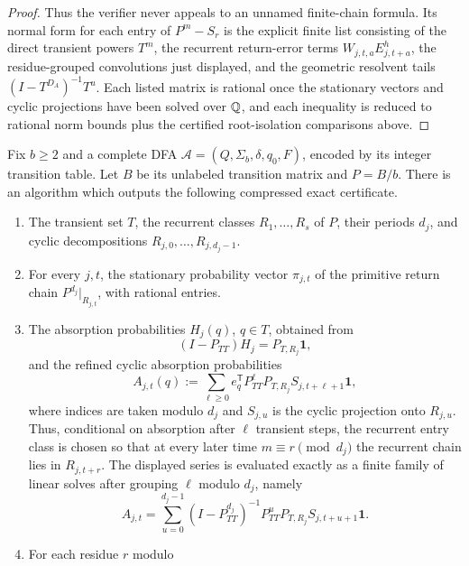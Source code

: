 \begin{proof}
  Thus the verifier never appeals to an unnamed finite-chain formula.
  Its normal form for each entry of \(P^m-S_r\) is the explicit finite
  list consisting of the direct transient powers \(T^m\), the recurrent
  return-error terms \(W_{j,t,a}E_{j,t+a}^h\), the residue-grouped
  convolutions just displayed, and the geometric resolvent tails
  \((I-T^{D_A})^{-1}T^u\). Each listed matrix is rational once the
  stationary vectors and cyclic projections have been solved over
  \(\mathbb{Q}\), and each inequality is reduced to rational norm bounds plus
  the certified root-isolation comparisons above.
\end{proof}

\begin{theorem}
  \label{thm:effective-fixed-dfa-prime-obstruction}
  Fix \(b\ge2\) and a complete DFA
  \(\mathcal A=(Q,\Sigma_b,\delta,q_0,F)\), encoded by its integer
  transition table. Let \(B\) be its unlabeled transition matrix and
  \(P=B/b\). There is an algorithm which outputs the following
  compressed exact certificate.
  \begin{enumerate}[label=\textup{(\alph*)}]
    \item The transient set \(T\), the recurrent classes
    \(R_1,\dots,R_s\) of \(P\), their periods \(d_j\), and cyclic
    decompositions \(R_{j,0},\dots,R_{j,d_j-1}\).
    \item For every \(j,t\), the stationary probability vector
    \(\pi_{j,t}\) of the primitive return chain
    \(P^{d_j}|_{R_{j,t}}\), with rational entries.
    \item The absorption probabilities \(H_j(q)\), \(q\in T\), obtained
    from
    \[
      (I-P_{TT})H_j=P_{T,R_j}\mathbf 1,
    \]
    and the refined cyclic absorption probabilities
    \[
      A_{j,t}(q)
      :=\sum_{\ell\ge0}
        e_q^{\mathsf T}P_{TT}^{\ell}P_{T,R_j}
        S_{j,t+\ell+1}\mathbf 1 ,
    \]
    where indices are taken modulo \(d_j\) and
    \(S_{j,u}\) is the cyclic projection onto \(R_{j,u}\).
    Thus, conditional on absorption after \(\ell\) transient steps, the
    recurrent entry class is chosen so that at every later time
    \(m\equiv r\pmod {d_j}\) the recurrent chain lies in
    \(R_{j,t+r}\). The displayed series is evaluated exactly as a
    finite family of linear solves after grouping \(\ell\) modulo
    \(d_j\), namely
    \[
      A_{j,t}
      =
      \sum_{u=0}^{d_j-1}
      (I-P_{TT}^{d_j})^{-1}P_{TT}^uP_{T,R_j}
      S_{j,t+u+1}\mathbf 1 .
    \]
    \item For each residue \(r\) modulo

\end{enumerate}
\end{theorem}
